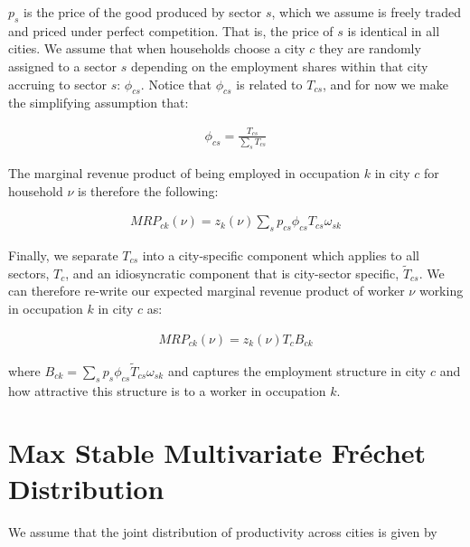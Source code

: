 \documentclass[10pt]{article}
\begin{document}
$p_{s}$ is the price of the good produced by sector $s$, which we assume is freely traded and priced under perfect competition. That is, the price of $s$ is identical in all cities. We assume that when households choose a city $c$ they are randomly assigned to a sector $s$ depending on the employment shares within that city accruing to sector $s$: $\phi_{cs}$. Notice that $\phi_{cs}$ is related to $T_{cs}$, and for now we make the simplifying assumption that:

\begin{align}
    \phi_{cs} = \frac{T_{cs}}{\sum_{s}^{} T_{cs}}
\end{align}

The marginal revenue product of being employed in occupation $k$ in city $c$ for household $\nu$ is therefore the following:

\begin{align}
    {MRP}_{ck}(\nu) = {z_{k}(\nu)}\sum_{s}^{} p_{cs} \phi_{cs} T_{cs} \omega_{sk}
\end{align}

Finally, we separate $T_{cs}$ into a city-specific component which applies to all sectors, $T_{c}$, and an idiosyncratic component that is city-sector specific, $\tilde{T}_{cs}$. We can therefore re-write our expected marginal revenue product of worker $\nu$ working in occupation $k$ in city $c$ as:

\begin{align}
    {MRP}_{ck}(\nu) = {z_{k}(\nu)}{T_{c}}{B_{ck}}
\end{align}

where $B_{ck} = \sum_{s}^{} p_{s} \phi_{cs} \tilde{T}_{cs} \omega_{sk}$ and captures the employment structure in city $c$ and how attractive this structure is to a worker in occupation $k$.



\section{Max Stable Multivariate Fréchet Distribution}

We assume that the joint distribution of productivity across cities is given by
\end{document}
